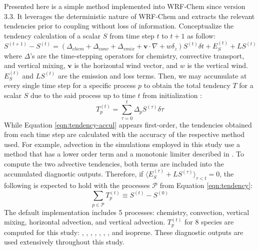 	Presented here is a simple method implemented into WRF-Chem since version 3.3. It leverages the deterministic nature of WRF-Chem and extracts the relevant tendencies prior to coupling without loss of information. Conceptualize the tendency calculation of a scalar $S$ from time step $t$ to $t+1$ as follow:
	\begin{equation}\label{eqn:tendency}
		S^{(t+1)}-S^{(t)} = (\Delta_{chem}+\Delta_{conv}+\Delta_{vmix}+\mathbf{v}\cdot\nabla + w\delta_z)S^{(t)}\delta t + E_S^{(t)} + LS^{(t)}
	\end{equation}
	where $\Delta$'s are the time-stepping operators for chemistry, convective transport, and vertical mixing, $\mathbf{v}$ is the horizontal wind vector, and $w$ is the vertical wind. $E_S^{(t)}$ and $LS^{(t)}$ are the emission and loss terms. Then, we may accumulate at every single time step for a specific process $p$ to obtain the total tendency $T$ for a scalar $S$ due to the said process up to time $t$ from initialization :
	\begin{equation}\label{eqn:tendency-accul}
		T_{p}^{(t)} = \sum_{\tau=0}^t\Delta_{p} S^{(\tau)}\delta\tau
	\end{equation}
	While Equation \ref{eqn:tendency-accul} appears first-order, the tendencies obtained from each time step are calculated with the accuracy of the respective method used. For example, advection in the simulations employed in this study use a method that has a lower order term and a monotonic limiter described in \citet{Skamarock:2006wm}. To compute the two advective tendencies, both terms are included into the accumulated diagnostic outputs. Therefore,  if $\langle E_S^{(\tau)}+LS^{(\tau)}\rangle_{\tau<t}=0$, the following is expected to hold with the processes $\mathcal{P}$ from Equation \ref{eqn:tendency}:
	\begin{equation}\label{eqn:tendency-good}
		\sum_{p\in\mathcal{P}}T_{p}^{(t)} \equiv S^{(t)}-S^{(0)}
	\end{equation}
	The default implementation includes 5 processes: chemistry, convection, vertical mixing, horizontal advection, and vertical advection. $T_{p}^{(t)}$ for 8 species are computed for this study: , , , , , , , and isoprene. These diagnostic outputs are used extensively throughout this study.
	
